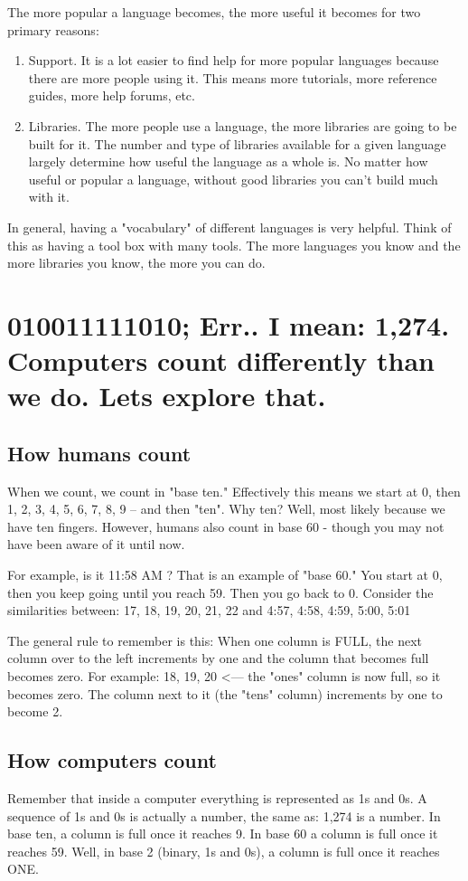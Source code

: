 \documentclass[a4paper,12pt]{article}
\let\stdsection\section
\renewcommand\section{\newpage\stdsection}
\begin{document}
The more popular a language becomes, the more useful it becomes for two primary reasons:
\begin{enumerate}
\item Support. It is a lot easier to find help for more popular languages because there are more people using it. This means more tutorials, more reference guides, more help forums, etc.
\item Libraries. The more people use a language, the more libraries are going to be built for it. The number and type of libraries available for a given language largely determine how useful the language as a whole is. No matter how useful or popular a language, without good libraries you can't build much with it.
\end{enumerate}
In general, having a "vocabulary" of different languages is very helpful. Think of this as having a tool box with many tools. The more languages you know and the more libraries you know, the more you can do.
\section{010011111010; Err.. I mean: 1,274. Computers count differently than we do. Lets explore that.}
\subsection{How humans count}
When we count, we count in "base ten." Effectively this means we start at 0, then 1, 2, 3, 4, 5, 6, 7, 8, 9 -- and then "ten". Why ten? Well, most likely because we have ten fingers. However, humans also count in base 60 - though you may not have been aware of it until now.

For example, is it 11:58 AM ? That is an example of "base 60." You start at 0, then you keep going until you reach 59. Then you go back to 0. Consider the similarities between:
17, 18, 19, 20, 21, 22
and
4:57, 4:58, 4:59, 5:00, 5:01

The general rule to remember is this: When one column is FULL, the next column over to the left increments by one and the column that becomes full becomes zero. For example:
18, 19, 20 <--- the "ones" column is now full, so it becomes zero. The column next to it (the "tens" column) increments by one to become 2.
\subsection{How computers count}
Remember that inside a computer everything is represented as 1s and 0s. A sequence of 1s and 0s is actually a number, the same as: 1,274 is a number. In base ten, a column is full once it reaches 9. In base 60 a column is full once it reaches 59. Well, in base 2 (binary, 1s and 0s), a column is full once it reaches ONE.
\end{document}
